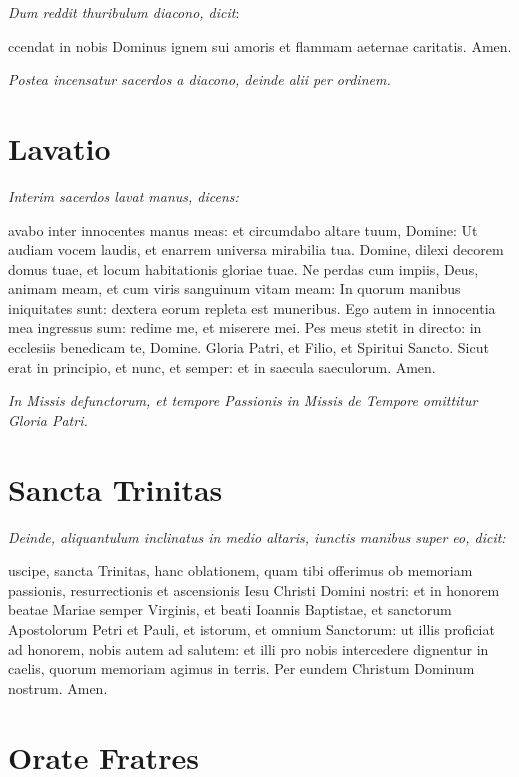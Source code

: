 \textit{Dum reddit thuribulum diacono, dicit}:

ccendat in nobis Dominus ignem sui amoris et flammam aeternae
caritatis.  Amen.

\textit{Postea incensatur sacerdos a diacono, deinde alii per ordinem.}


\section{Lavatio}

\textit{Interim sacerdos lavat manus, dicens:}


avabo inter innocentes manus meas: et circumdabo altare tuum,
Domine: Ut audiam vocem laudis, et enarrem universa mirabilia tua.  Domine,
dilexi decorem domus tuae, et locum habitationis gloriae tuae.  Ne perdas cum
impiis, Deus, animam meam, et cum viris sanguinum vitam meam: In quorum manibus
iniquitates sunt: dextera eorum repleta est muneribus.  Ego autem in innocentia
mea ingressus sum: redime me, et miserere mei.  Pes meus stetit in directo: in
ecclesiis benedicam te, Domine.  Gloria Patri, et Filio, et Spiritui Sancto.
Sicut erat in principio, et nunc, et semper: et in saecula saeculorum.  Amen.

\divisio

\textit{%
    In Missis defunctorum, et tempore Passionis in Missis de Tempore omittitur
    Gloria Patri.
}

\divisio

\section{Sancta Trinitas}

\textit{%
    Deinde, aliquantulum inclinatus in medio altaris, iunctis manibus super eo,
    dicit:
}

uscipe, sancta Trinitas, hanc oblationem, quam tibi offerimus ob
memoriam passionis, resurrectionis et ascensionis Iesu Christi Domini nostri: et
in honorem beatae Mariae semper Virginis, et beati Ioannis Baptistae, et
sanctorum Apostolorum Petri et Pauli, et istorum, et omnium Sanctorum: ut illis
proficiat ad honorem, nobis autem ad salutem: et illi pro nobis intercedere
dignentur in caelis, quorum memoriam agimus in terris.  Per eundem Christum
Dominum nostrum.  Amen.

\section{Orate Fratres}

